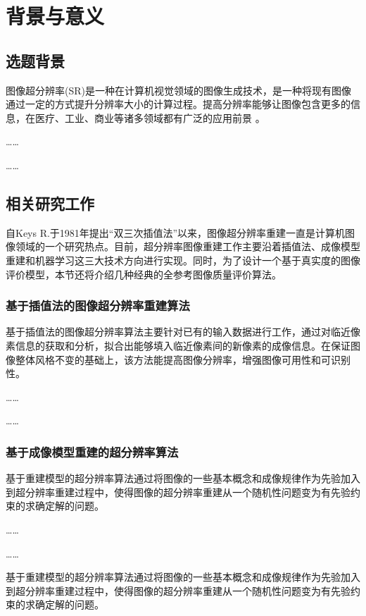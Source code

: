 
\chapter{背景与意义} 

\section{选题背景} 

图像超分辨率(SR)\cite{kim2010csmacdwithreservations}是一种在计算机视觉领域的图像生成技术，是一种将现有图像通过一定的方式提升分辨率大小的计算过程。提高分辨率能够让图像包含更多的信息，在医疗、工业、商业等诸多领域都有广泛的应用前景 。

……

……


\section{相关研究工作}

自Keys R.于1981年提出“双三次插值法”\cite{songqi2020huaweiharmonyos}以来，图像超分辨率重建一直是计算机图像领域的一个研究热点。目前，超分辨率图像重建工作主要沿着插值法、成像模型重建和机器学习这三大技术方向进行实现。同时，为了设计一个基于真实度的图像评价模型，本节还将介绍几种经典的全参考图像质量评价算法。

\subsection{基于插值法的图像超分辨率重建算法} 

基于插值法的图像超分辨率算法主要针对已有的输入数据进行工作，通过对临近像素信息的获取和分析，拟合出能够填入临近像素间的新像素的成像信息。在保证图像整体风格不变的基础上，该方法能提高图像分辨率，增强图像可用性和可识别性。

……

……

\subsection{基于成像模型重建的超分辨率算法}

基于重建模型的超分辨率算法通过将图像的一些基本概念和成像规律作为先验加入到超分辨率重建过程中，使得图像的超分辨率重建从一个随机性问题变为有先验约束的求确定解的问题。

……

……

基于重建模型的超分辨率算法通过将图像的一些基本概念和成像规律作为先验加入到超分辨率重建过程中，使得图像的超分辨率重建从一个随机性问题变为有先验约束的求确定解的问题。

